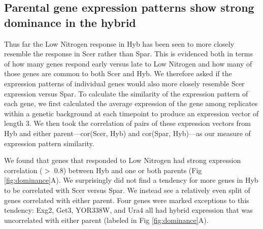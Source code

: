\subsection{Parental gene expression patterns show strong dominance in the hybrid}

Thus far the Low Nitrogen response in Hyb has been seen to more closely resemble the response in Scer rather than Spar. This is evidenced both in terms of how many genes respond early versus late to Low Nitrogen and how many of those genes are common to both Scer and Hyb. We therefore asked if the expression patterns of individual genes would also more closely resemble Scer expression versus Spar. To calculate the similarity of the expression pattern of each gene, we first calculated the average expression of the gene among replicates within a genetic background at each timepoint to produce an expression vector of length 3. We then took the correlation of pairs of these expression vectors from Hyb and either parent---cor(Scer, Hyb) and cor(Spar, Hyb)---as our measure of expression pattern similarity.

\begin{SCfigure}
    \caption{\textbf{Hybrid expression is strongly correlated with at least one parental species}. A) Correlation of hybrid expression vector (averaged expression among replicates at each timepoint) with the expression vectors of each parent. Only genes that responded to Low Nitrogen in at least one background are included. B) Same correlations as A, now including genes that were not considered responsive to Low Nitrogen but excluding genes that were highly correlated with both parents (cor(Scer, Hyb) $>$ 0.8 and/or cor(Spar, Hyb) $>$ 0.8.}
    \label{fig:dominance}
\end{SCfigure}

We found that genes that responded to Low Nitrogen had strong expression correlation ($>$ 0.8) between Hyb and one or both parents (Fig \ref{fig:dominance}A). We surprisingly did not find a tendency for more genes in Hyb to be correlated with Scer versus Spar. We instead see a relatively even split of genes correlated with either parent. Four genes were marked exceptions to this tendency: Exg2, Get3, YOR338W, and Ura4 all had hybrid expression that was uncorrelated with either parent (labeled in Fig \ref{fig:dominance}A). 

